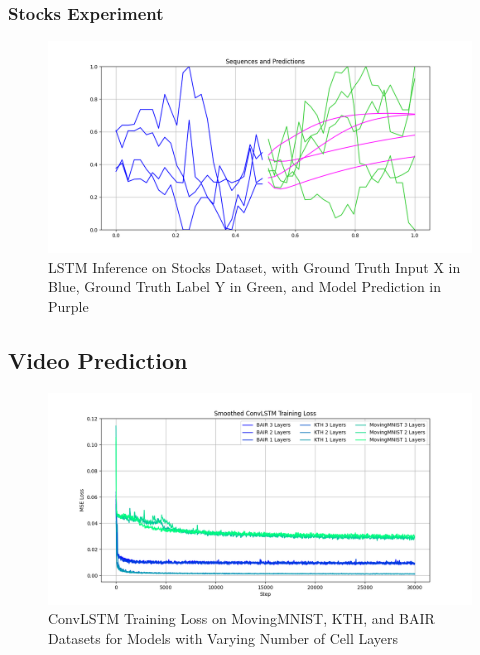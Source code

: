 \documentclass{scrartcl}
\begin{document}
\subsubsection{Stocks Experiment}
\label{subsubsec:stocks}

\begin{figure}[H]
	\centering
	\includegraphics[width=1\textwidth]{plots/lstm_stocks_inference.png}
	\caption{LSTM Inference on Stocks Dataset, with Ground Truth Input X in Blue, Ground Truth Label Y in Green, and Model Prediction in Purple}
	\label{plt:lstm_stocks_inference}
\end{figure}

\newpage
\subsection{Video Prediction}
\label{subsec:experiment_vp}

\begin{figure}[H]
	\centering
	\includegraphics[width=1\textwidth]{plots/convlstm_train_loss.png}
	\caption{ConvLSTM Training Loss on MovingMNIST, KTH, and BAIR Datasets for Models with Varying Number of Cell Layers}
	\label{plt:convlstm_train_loss}
\end{figure}
\end{document}
